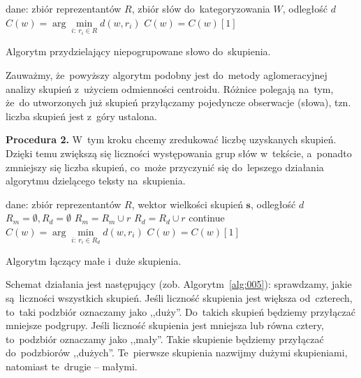 \documentclass{praca1}
\begin{document}
\begin{algorithm}[h!]
\begin{algorithmic}[1]
		\State dane: zbiór reprezentantów $R$, zbiór słów do~kategoryzowania $W$, odległość $d$
            \State $C(w) = \arg \min\limits_{i:\ r_i \in R} d(w,r_i)$
            	\State $C(w) = C(w)[1]$
            \EndIf
       \EndFor
\end{algorithmic}
\caption{Algorytm przydzielający niepogrupowane słowo do~skupienia.}\label{alg:004}
\end{algorithm}

Zauważmy, że~powyższy algorytm podobny jest do~metody aglomeracyjnej analizy skupień z~użyciem odmienności centroidu. Różnice polegają na~tym, że~do utworzonych już skupień przyłączamy pojedyncze obserwacje (słowa), tzn. liczba skupień jest z~góry ustalona.

\textbf{Procedura 2.} W~tym kroku chcemy zredukować liczbę uzyskanych skupień. Dzięki temu zwiększą się liczności występowania grup słów w~tekście, a~ponadto zmniejszy się liczba skupień, co~może przyczynić się do~lepszego działania algorytmu dzielącego teksty na~skupienia.

\begin{algorithm}[h!]
\begin{algorithmic}[1]
		\State dane: zbiór reprezentantów $R$, wektor wielkości skupień $\mathbf{s}$, odległość $d$
		\State $R_m = \emptyset, R_d = \emptyset$
				\State $R_m = R_m \cup r$
			\Else
				\State $R_d = R_d \cup r$
			\EndIf
		\EndFor
        		\State continue
        	\EndIf
            \State $C(w) = \arg\min\limits_{i:\ r_i \in R_d} d(w,r_i)$
            	\State $C(w) = C(w)[1]$
            \EndIf
       \EndFor
\end{algorithmic}
\caption{Algorytm łączący małe i~duże skupienia.}\label{alg:005}
\end{algorithm}

Schemat działania jest następujący (zob. Algorytm~\ref{alg:005}): sprawdzamy, jakie są~liczności wszystkich skupień. Jeśli liczność skupienia jest większa od~czterech, to~taki podzbiór oznaczamy jako ,,duży''. Do~takich skupień będziemy przyłączać mniejsze podgrupy. Jeśli liczność skupienia jest mniejsza lub równa cztery, to~podzbiór oznaczamy jako ,,mały''. Takie skupienie będziemy przyłączać do~podzbiorów ,,dużych''. Te~pierwsze skupienia nazwijmy dużymi skupieniami, natomiast te~drugie -- małymi. 
\end{document}
